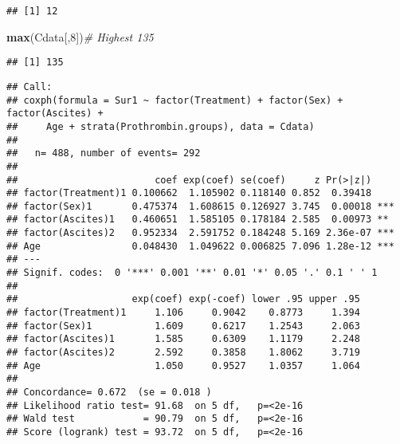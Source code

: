 \documentclass[
]{article}
\newenvironment{Shaded}{\begin{snugshade}}{\end{snugshade}}
\newcommand{\CommentTok}[1]{\textcolor[rgb]{0.56,0.35,0.01}{\textit{#1}}}
\newcommand{\DataTypeTok}[1]{\textcolor[rgb]{0.13,0.29,0.53}{#1}}
\newcommand{\DecValTok}[1]{\textcolor[rgb]{0.00,0.00,0.81}{#1}}
\newcommand{\FloatTok}[1]{\textcolor[rgb]{0.00,0.00,0.81}{#1}}
\newcommand{\KeywordTok}[1]{\textcolor[rgb]{0.13,0.29,0.53}{\textbf{#1}}}
\newcommand{\NormalTok}[1]{#1}
\newcommand{\OperatorTok}[1]{\textcolor[rgb]{0.81,0.36,0.00}{\textbf{#1}}}
\newcommand{\OtherTok}[1]{\textcolor[rgb]{0.56,0.35,0.01}{#1}}
\newcommand{\StringTok}[1]{\textcolor[rgb]{0.31,0.60,0.02}{#1}}
\begin{document}
\begin{verbatim}
## [1] 12
\end{verbatim}

\begin{Shaded}
\begin{Highlighting}[]
\KeywordTok{max}\NormalTok{(Cdata[,}\DecValTok{8}\NormalTok{])}\CommentTok{# Highest 135}
\end{Highlighting}
\end{Shaded}

\begin{verbatim}
## [1] 135
\end{verbatim}

\begin{Shaded}
\end{Shaded}

\begin{verbatim}
## Call:
## coxph(formula = Sur1 ~ factor(Treatment) + factor(Sex) + factor(Ascites) + 
##     Age + strata(Prothrombin.groups), data = Cdata)
## 
##   n= 488, number of events= 292 
## 
##                        coef exp(coef) se(coef)     z Pr(>|z|)    
## factor(Treatment)1 0.100662  1.105902 0.118140 0.852  0.39418    
## factor(Sex)1       0.475374  1.608615 0.126927 3.745  0.00018 ***
## factor(Ascites)1   0.460651  1.585105 0.178184 2.585  0.00973 ** 
## factor(Ascites)2   0.952334  2.591752 0.184248 5.169 2.36e-07 ***
## Age                0.048430  1.049622 0.006825 7.096 1.28e-12 ***
## ---
## Signif. codes:  0 '***' 0.001 '**' 0.01 '*' 0.05 '.' 0.1 ' ' 1
## 
##                    exp(coef) exp(-coef) lower .95 upper .95
## factor(Treatment)1     1.106     0.9042    0.8773     1.394
## factor(Sex)1           1.609     0.6217    1.2543     2.063
## factor(Ascites)1       1.585     0.6309    1.1179     2.248
## factor(Ascites)2       2.592     0.3858    1.8062     3.719
## Age                    1.050     0.9527    1.0357     1.064
## 
## Concordance= 0.672  (se = 0.018 )
## Likelihood ratio test= 91.68  on 5 df,   p=<2e-16
## Wald test            = 90.79  on 5 df,   p=<2e-16
## Score (logrank) test = 93.72  on 5 df,   p=<2e-16
\end{verbatim}
\end{document}
